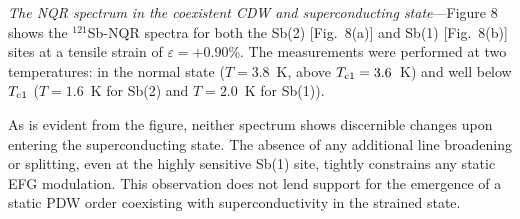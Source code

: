 \documentclass[aps,prl,twocolumn,superscriptaddress]{revtex4-2}
\begin{document}
{\it The NQR spectrum in the coexistent CDW and superconducting state}---Figure 8 shows the $^{121}$Sb-NQR spectra for both the Sb(2) [Fig.~8(a)] and Sb(1) [Fig.~8(b)] sites at a tensile strain of $\varepsilon = +0.90$\%. The measurements were performed at two temperatures: in the normal state ($T = 3.8$~K, above $T_{\rm c1} = 3.6$~K) and well below $T_{\rm c1}$ ($T = 1.6$~K for Sb(2) and $T = 2.0$~K for Sb(1)).


As is evident from the figure, neither spectrum shows discernible changes upon entering the superconducting state. The absence of any additional line broadening or splitting, even at the highly sensitive Sb(1) site, tightly constrains any static EFG modulation. This observation does not lend support for the emergence of a static PDW order coexisting with superconductivity in the strained state.
\end{document}
